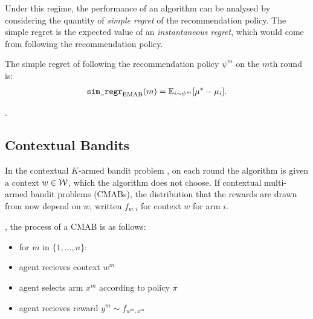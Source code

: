         Under this regime, the performance of an algorithm can be analysed by considering the quantity of \textit{simple regret} of the recommendation policy. The simple regret is the expected value of an \textit{instantaneous regret},  which would come from following the recommendation policy.

        \begin{defn}
            The \textnormal{simple regret} of following the recommendation policy $\psi^m$ on the $m$th round is:
            \begin{align}
                {\textnormal{\texttt{sim\_regr}}}_{{\textnormal{EMAB}}}(m) = \mathbb{E}_{i\sim\psi^m}[\mu^* - \mu_i].
            \end{align}
        \end{defn}


        .



    
    \subsection{Contextual Bandits}
    \label{sec:2-3-2-contextual-mab}


        In the contextual $K$-armed bandit problem , on each round the algorithm is given a context $w\in \mathcal{W}$, which the algorithm does not choose. If contextual multi-armed bandit problems (CMABs), the distribution that the rewards are drawn from now depend on $w$, written $f_{w,i}$ for context $w$ for arm $i$. 


        , the process of a CMAB is as follows:
        \begin{itemize}
            \item for $m$ in $\{1,...,n\}$:
            \item agent recieves context $w^m$
            \item agent selects arm $x^m$ according to policy $\pi$
            \item agent recieves reward $y^m \sim f_{w^m,x^m}$
        \end{itemize}

